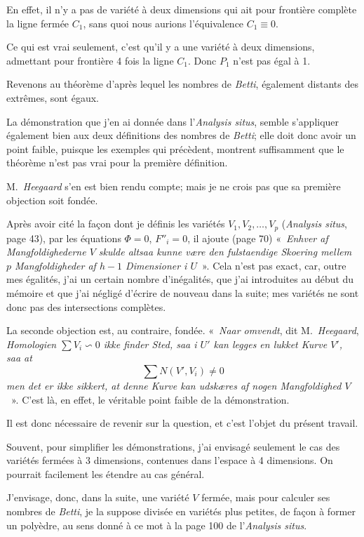 \documentclass{article}
\begin{document}
En effet, il n'y a pas de variété à deux dimensions qui ait pour frontière complète la ligne fermée $C_{1}$, sans quoi nous aurions l'équivalence $C_{1} \equiv 0$.

Ce qui est vrai seulement, c'est qu'il y a une variété à deux dimensions, admettant pour frontière 4 fois la ligne $C_{1}$. Donc $P_{1}$ n'est pas égal à 1.

Revenons au théorème d'après lequel les nombres de \emph{Betti}, également distants des extrêmes, sont égaux.

La démonstration que j'en ai donnée dans l'\emph{Analysis situs}, semble s'appliquer également bien aux deux définitions des nombres de \emph{Betti}; elle doit donc avoir un point faible, puisque les exemples qui précèdent, montrent suffisamment que le théorème n'est pas vrai pour la première définition.

M.~\emph{Heegaard} s'en est bien rendu compte; mais je ne crois pas que sa première objection soit fondée.

Après avoir cité la façon dont je définis les variétés $V_{1}, V_{2}, \ldots, V_{p}$ (\emph{Analysis situs}, page 43), par les équations $\Phi = 0$, $F''_{i} = 0$, il ajoute (page 70) «~\emph{Enhver af Mangfoldighederne $V$ skulde altsaa kunne være den fulstaendige Skoering mellem $p$ Mangfoldigheder af $h - 1$ Dimensioner i $U$}~». Cela n'est pas exact, car, outre mes égalités, j'ai un certain nombre d'inégalités, que j'ai introduites au début du mémoire et que j'ai négligé d'écrire de nouveau dans la suite; mes variétés ne sont donc pas des intersections complètes.

La seconde objection est, au contraire, fondée. «~\emph{Naar omvendt}, dit M.~\emph{Heegaard}, \emph{Homologien $\displaystyle\sum V_{i} \backsim 0$ ikke finder Sted, saa i $U'$ kan legges en lukket Kurve $V'$, saa at}
\[ \sum N(V', V_{i}) \neq 0 \]
\emph{men det er ikke sikkert, at denne Kurve kan udskæres af nogen Mangfoldighed $V$}~». C'est là, en effet, le véritable point faible de la démonstration.


Il est donc nécessaire de revenir sur la question, et c'est l'objet du présent travail.

Souvent, pour simplifier les démonstrations, j'ai envisagé seulement le cas des variétés fermées à 3 dimensions, contenues dans l'espace à 4 dimensions. On pourrait facilement les étendre au cas général.

J'envisage, donc, dans la suite, une variété $V$ fermée, mais pour calculer ses nombres de \emph{Betti}, je la suppose divisée en variétés plus petites, de façon à former un polyèdre, au sens donné à ce mot à la page 100 de l'\emph{Analysis situs}.
\end{document}

